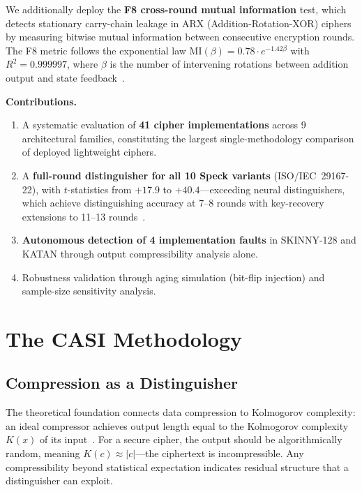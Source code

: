 \documentclass[conference]{IEEEtran}
\begin{document}
We additionally deploy the \textbf{F8 cross-round mutual information} test, which detects stationary carry-chain leakage in ARX (Addition-Rotation-XOR) ciphers by measuring bitwise mutual information between consecutive encryption rounds.
The F8 metric follows the exponential law $\text{MI}(\beta) = 0.78 \cdot e^{-1.42\beta}$ with $R^2 = 0.999997$, where $\beta$ is the number of intervening rotations between addition output and state feedback~\cite{foss2026icecet}.

\textbf{Contributions.}
\begin{enumerate}
    \item A systematic evaluation of \textbf{41 cipher implementations} across 9 architectural families, constituting the largest single-methodology comparison of deployed lightweight ciphers.
    \item A \textbf{full-round distinguisher for all 10 Speck variants} (ISO/IEC~29167-22), with $t$-statistics from $+17.9$ to $+40.4$---exceeding neural distinguishers, which achieve distinguishing accuracy at 7--8 rounds with key-recovery extensions to 11--13 rounds~\cite{gohr2019}.
    \item \textbf{Autonomous detection of 4 implementation faults} in SKINNY-128 and KATAN through output compressibility analysis alone.
    \item Robustness validation through aging simulation (bit-flip injection) and sample-size sensitivity analysis.
\end{enumerate}


\section{The CASI Methodology}
\label{sec:method}

\subsection{Compression as a Distinguisher}

The theoretical foundation connects data compression to Kolmogorov complexity: an ideal compressor achieves output length equal to the Kolmogorov complexity $K(x)$ of its input~\cite{liuvitanyi2019}.
For a secure cipher, the output should be algorithmically random, meaning $K(c) \approx |c|$---the ciphertext is incompressible.
Any compressibility beyond statistical expectation indicates residual structure that a distinguisher can exploit.
\end{document}
